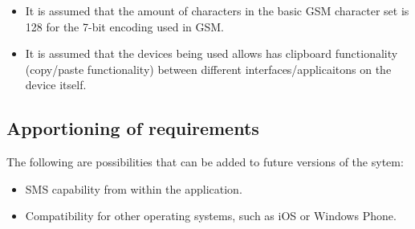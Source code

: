 \begin{itemize}
\item It is assumed that the amount of characters in the basic GSM character set is 128 for the 7-bit encoding used in GSM.
\item It is assumed that the devices being used allows has clipboard functionality (copy/paste functionality) between different interfaces/applicaitons on the device itself.
\end{itemize}

\subsection{Apportioning of requirements}
The following are possibilities that can be added to future versions of the sytem:
\begin{itemize}
\item SMS capability from within the application.
\item Compatibility for other operating systems, such as iOS or Windows Phone.
\end{itemize}